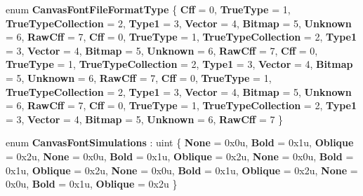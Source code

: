 \begin{DoxyCompactItemize}
enum {\bfseries Canvas\+Font\+File\+Format\+Type} \{ \newline
{\bfseries Cff} = 0, 
{\bfseries True\+Type} = 1, 
{\bfseries True\+Type\+Collection} = 2, 
{\bfseries Type1} = 3, 
\newline
{\bfseries Vector} = 4, 
{\bfseries Bitmap} = 5, 
{\bfseries Unknown} = 6, 
{\bfseries Raw\+Cff} = 7, 
\newline
{\bfseries Cff} = 0, 
{\bfseries True\+Type} = 1, 
{\bfseries True\+Type\+Collection} = 2, 
{\bfseries Type1} = 3, 
\newline
{\bfseries Vector} = 4, 
{\bfseries Bitmap} = 5, 
{\bfseries Unknown} = 6, 
{\bfseries Raw\+Cff} = 7, 
\newline
{\bfseries Cff} = 0, 
{\bfseries True\+Type} = 1, 
{\bfseries True\+Type\+Collection} = 2, 
{\bfseries Type1} = 3, 
\newline
{\bfseries Vector} = 4, 
{\bfseries Bitmap} = 5, 
{\bfseries Unknown} = 6, 
{\bfseries Raw\+Cff} = 7, 
\newline
{\bfseries Cff} = 0, 
{\bfseries True\+Type} = 1, 
{\bfseries True\+Type\+Collection} = 2, 
{\bfseries Type1} = 3, 
\newline
{\bfseries Vector} = 4, 
{\bfseries Bitmap} = 5, 
{\bfseries Unknown} = 6, 
{\bfseries Raw\+Cff} = 7, 
\newline
{\bfseries Cff} = 0, 
{\bfseries True\+Type} = 1, 
{\bfseries True\+Type\+Collection} = 2, 
{\bfseries Type1} = 3, 
\newline
{\bfseries Vector} = 4, 
{\bfseries Bitmap} = 5, 
{\bfseries Unknown} = 6, 
{\bfseries Raw\+Cff} = 7
 \}
\item 
\mbox{\label{namespace_microsoft_1_1_graphics_1_1_canvas_1_1_text_a2a86f72637a3f77480105b5a22f96b31}} 
enum {\bfseries Canvas\+Font\+Simulations} \+: uint \{ \newline
{\bfseries None} = 0x0u, 
{\bfseries Bold} = 0x1u, 
{\bfseries Oblique} = 0x2u, 
{\bfseries None} = 0x0u, 
\newline
{\bfseries Bold} = 0x1u, 
{\bfseries Oblique} = 0x2u, 
{\bfseries None} = 0x0u, 
{\bfseries Bold} = 0x1u, 
\newline
{\bfseries Oblique} = 0x2u, 
{\bfseries None} = 0x0u, 
{\bfseries Bold} = 0x1u, 
{\bfseries Oblique} = 0x2u, 
\newline
{\bfseries None} = 0x0u, 
{\bfseries Bold} = 0x1u, 
{\bfseries Oblique} = 0x2u
 \}
\item 
\mbox{\label{namespace_microsoft_1_1_graphics_1_1_canvas_1_1_text_a73fd564ee5399477f9a464ec4ba43d40}} 

\end{DoxyCompactItemize}
